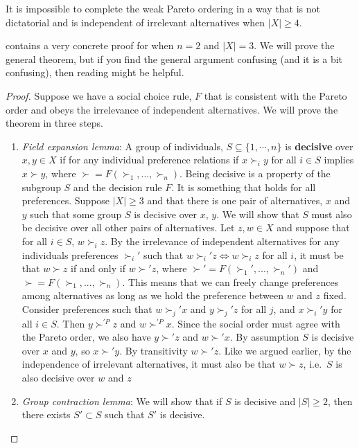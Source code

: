 \begin{theorem}
  It is impossible to complete the weak Pareto ordering in a way that
  is not dictatorial and is independent of irrelevant alternatives
  when $|X| \geq 4$. 
\end{theorem}
\cite{feldman1974} contains a very concrete proof for when $n=2$ and
$|X|=3$. We will prove the general theorem, but if you find the
general argument confusing (and it is a bit confusing), then reading
\cite{feldman1974} might be helpful.
\begin{proof}
  Suppose we have a social choice rule, $F$ that is consistent with
  the Pareto order and obeys the irrelevance of independent
  alternatives. We will prove the theorem in three steps.
  \begin{enumerate}
  \item \emph{Field expansion lemma}: A group of individuals, $S
    \subseteq \{1,\cdots,n\}$ is \textbf{decisive} over $x, y \in X$
    if for any individual preference relations if $x \succ_i y$ for
    all $i \in S$ implies $x \succ y$, where $\succ=F(\succ_1,...,
    \succ_n)$. Being decisive is a property of the subgroup $S$ and
    the decision rule $F$. It is something that holds for all
    preferences. Suppose $|X|\geq 3$ and that there is one pair of
    alternatives, $x$ and $y$ such that some group $S$ is decisive
    over $x$, $y$.  We will show that $S$ must also be decisive over
    all other pairs of alternatives.  Let $z, w\in X$ and suppose that
    for all $i \in S$, $w \succ_i z$. By the irrelevance of
    independent alternatives for any individuals preferences
    $\succ_i'$ such that $w \succ_i' z \iff w \succ_i z$ for all $i$,
    it must be that $w \succ z$ if and only if $w \succ' z$, where
    $\succ'=F(\succ_1',...,\succ_n')$ and
    $\succ=F(\succ_1,...,\succ_n)$.  This means that we can freely
    change preferences among alternatives as long as we hold the
    preference between $w$ and $z$ fixed. Consider preferences such
    that $w \succ_j' x$ and $y \succ_j' z$ for all $j$, and $x
    \succ_i' y$ for all $i \in S$. Then $y \succ^{'P} z$ and $w
    \succ^{'P} x$. Since the social order must agree with the Pareto
    order, we also have $y \succ' z$ and $w \succ' x$. By assumption
    $S$ is decisive over $x$ and $y$, so $x \succ' y$. By transitivity
    $w \succ' z$. Like we argued earlier, by the independence of
    irrelevant alternatives, it must also be that $w \succ z$, i.e.\
    $S$ is also decisive over $w$ and $z$
  \item \emph{Group contraction lemma}: We will show that if $S$ is
    decisive and $|S| \geq 2$, then there exists $S' \subset S$ such
    that $S'$ is decisive. 
    

\end{enumerate}
\end{proof}
